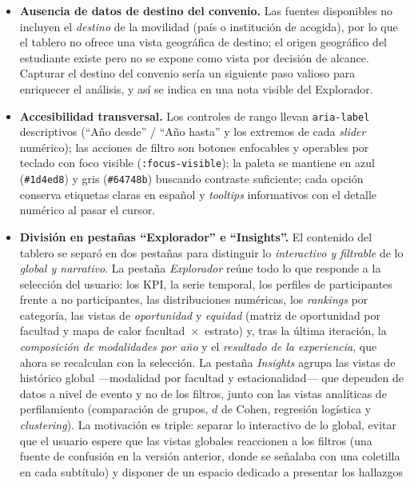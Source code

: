 \documentclass[12pt,a4paper]{article}
\begin{document}
\begin{itemize}[leftmargin=*]
    \emph{histórico global} en la pestaña \emph{Insights} y lo señalan en su
    subtítulo.
    \item \textbf{Ausencia de datos de destino del convenio.} Las fuentes
    disponibles no incluyen el \emph{destino} de la movilidad (país o institución de
    acogida), por lo que el tablero no ofrece una vista geográfica de destino; el
    origen geográfico del estudiante existe pero no se expone como vista por decisión
    de alcance. Capturar el destino del convenio sería un siguiente paso valioso para
    enriquecer el análisis, y así se indica en una nota visible del Explorador.
    \item \textbf{Accesibilidad transversal.} Los controles de rango llevan
    \texttt{aria-label} descriptivos (``Año desde'' / ``Año hasta'' y los extremos de
    cada \emph{slider} numérico); las acciones de filtro son botones enfocables y
    operables por teclado con foco visible (\texttt{:focus-visible}); la paleta se
    mantiene en azul (\texttt{\#1d4ed8}) y gris (\texttt{\#64748b}) buscando
    contraste suficiente; cada opción conserva etiquetas claras en español y
    \emph{tooltips} informativos con el detalle numérico al pasar el cursor.
    \item \textbf{División en pestañas ``Explorador'' e ``Insights''.} El contenido
    del tablero se separó en dos pestañas para distinguir lo \emph{interactivo y
    filtrable} de lo \emph{global y narrativo}. La pestaña \emph{Explorador} reúne
    todo lo que responde a la selección del usuario: los KPI, la serie temporal, los
    perfiles de participantes frente a no participantes, las distribuciones
    numéricas, los \emph{rankings} por categoría, las vistas de \emph{oportunidad} y
    \emph{equidad} (matriz de oportunidad por facultad y mapa de calor
    facultad~$\times$~estrato) y, tras la última iteración, la \emph{composición de
    modalidades por año} y el \emph{resultado de la experiencia}, que ahora se
    recalculan con la selección. La pestaña \emph{Insights} agrupa las vistas de
    histórico global ---modalidad por facultad y estacionalidad--- que dependen de
    datos a nivel de evento y no de los filtros, junto con las vistas analíticas de
    perfilamiento (comparación de grupos, $d$ de Cohen, regresión logística y
    \emph{clustering}).
    La motivación es triple: separar lo interactivo de lo global, evitar que el
    usuario espere que las vistas globales reaccionen a los filtros (una fuente de
    confusión en la versión anterior, donde se señalaba con una coletilla en cada
    subtítulo) y disponer de un espacio dedicado a presentar los hallazgos

\end{itemize}
\end{document}
